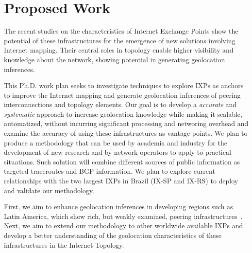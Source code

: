 \chapter{Proposed Work}\label{cap:proposal}
\thispagestyle{empty}


	The recent studies on the characteristics of Internet Exchange Points show the potential of these infrastructures for the emergence of new solutions involving Internet mapping. Their central roles in topology enable higher visibility and knowledge about the network, showing potential in generating geolocation inferences.

	This Ph.D. work plan seeks to investigate techniques to explore IXPs as anchors to improve the Internet mapping and generate geolocation inferences of peering interconnections and topology elements. Our goal is to develop a \emph{accurate} and \emph{systematic} approach to increase geolocation knowledge while making it scalable, automatized, without incurring significant processing and networing overhead and examine the accuracy of using these infrastructures as vantage points. We plan to produce a methodology that can be used by academia and industry for the development of new research and by network operators to apply to practical situations. Such solution will combine different sources of public information as targeted traceroutes and BGP information. We plan to explore current relationships with the two largest IXPs in Brazil (IX-SP and IX-RS) to deploy and validate our methodology.

	First, we aim to enhance geolocation inferences in developing regions such as Latin America, which show rich, but weakly examined, peering infrastructures~\cite{IXbr, DissectingBrazilianIXP}. Next, we aim to extend our methodology to other worldwide available IXPs and develop a better understanding of the geolocation characteristics of these infrastructures in the Internet Topology.

